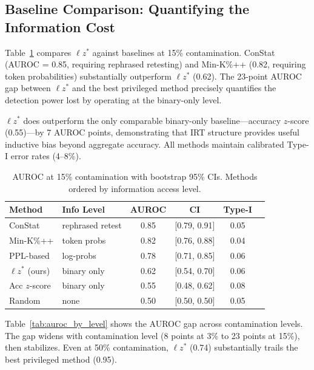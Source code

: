 \documentclass[11pt,a4paper]{article}
\newcommand{\lzstar}{\ensuremath{\ell z^*}}
\begin{document}
\subsection{Baseline Comparison: Quantifying the Information Cost}
\label{sec:baselines}

Table~\ref{tab:baseline_auroc} compares $\lzstar$ against baselines at 15\% contamination.
ConStat (AUROC = 0.85, requiring rephrased retesting) and Min-K\%++ (0.82, requiring token probabilities) substantially outperform $\lzstar$ (0.62).
The 23-point AUROC gap between $\lzstar$ and the best privileged method precisely quantifies the detection power lost by operating at the binary-only level.

$\lzstar$ does outperform the only comparable binary-only baseline---accuracy $z$-score (0.55)---by 7 AUROC points, demonstrating that IRT structure provides useful inductive bias beyond aggregate accuracy.
All methods maintain calibrated Type-I error rates (4--8\%).

\begin{table}[t]
\centering
\small
\caption{AUROC at 15\% contamination with bootstrap 95\% CIs. Methods ordered by information access level.}
\label{tab:baseline_auroc}
\begin{tabular}{llcccc}
\toprule
\textbf{Method} & \textbf{Info Level} & \textbf{AUROC} & \textbf{CI} & \textbf{Type-I} \\
\midrule
ConStat & rephrased retest & 0.85 & [0.79, 0.91] & 0.05 \\
Min-K\%++ & token probs & 0.82 & [0.76, 0.88] & 0.04 \\
PPL-based & log-probs & 0.78 & [0.71, 0.85] & 0.06 \\
$\lzstar$ (ours) & binary only & 0.62 & [0.54, 0.70] & 0.06 \\
Acc $z$-score & binary only & 0.55 & [0.48, 0.62] & 0.08 \\
Random & none & 0.50 & [0.50, 0.50] & 0.05 \\
\bottomrule
\end{tabular}
\end{table}

Table~\ref{tab:auroc_by_level} shows the AUROC gap across contamination levels.
The gap widens with contamination level (8 points at 3\% to 23 points at 15\%), then stabilizes.
Even at 50\% contamination, $\lzstar$ (0.74) substantially trails the best privileged method (0.95).
\end{document}
